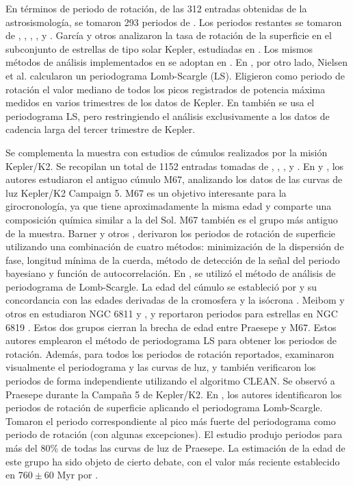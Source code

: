 En términos de periodo de rotación, de las 312 entradas obtenidas de la astrosismología, se tomaron 293 periodos de \cite{Garcia14}. Los periodos restantes se tomaron de \cite{Ceillier16}, \cite{Mazeh15}, \cite{McQuillan13a}, \cite{McQuillan14}, \cite{Nielsen13} y \cite{Reinhold13}. García y otros \cite{Garcia14} analizaron la tasa de rotación de la superficie en el subconjunto de estrellas de tipo solar Kepler, estudiadas en \cite{Garcia14}. Los mismos métodos de análisis implementados en \cite{Garcia14} se adoptan en \cite{Ceillier16}. En \cite{Nielsen13}, por otro lado, Nielsen et al. calcularon un periodograma Lomb-Scargle (LS). Eligieron como periodo de rotación el valor mediano de todos los picos registrados de potencia máxima medidos en varios trimestres de los datos de Kepler. En \cite{Reinhold13} también se usa el periodograma LS, pero restringiendo el análisis exclusivamente a los datos de cadencia larga del tercer trimestre de Kepler.

Se complementa la muestra con estudios de cúmulos realizados por la misión Kepler/K2. Se recopilan un total de 1152 entradas tomadas de \cite{Barnes16}, \cite{Gonzalez16}, \cite{Meibom11}, \cite{Meibom15} y \cite{Rebull17}. En \cite{Barnes16} y \cite{Gonzalez16}, los autores estudiaron el antiguo cúmulo M67, analizando los datos de las curvas de luz Kepler/K2 Campaign 5. M67 es un objetivo interesante para la girocronología, ya que tiene aproximadamente la misma edad y comparte una composición química similar a la del Sol. M67 también es el grupo más antiguo de la muestra. Barner y otros \cite{Barnes16}, derivaron los periodos de rotación de superficie utilizando una combinación de cuatro métodos: minimización de la dispersión de fase, longitud mínima de la cuerda, método de detección de la señal del periodo bayesiano y función de autocorrelación. En \cite{Gonzalez16}, se utilizó el método de análisis de periodograma de Lomb-Scargle. La edad del cúmulo se estableció por \cite{Barnes16} y su concordancia con las edades derivadas de la cromosfera \cite{Giampapa06} y la isócrona \cite{Bellini10}. Meibom y otros en \cite{Meibom11} estudiaron NGC 6811 \cite{Janes13} y \cite{Meibom15}, y reportaron periodos para estrellas en NGC 6819 \cite{Jeffries13}. Estos dos grupos cierran la brecha de edad entre Praesepe y M67. Estos autores emplearon el método de periodograma LS para obtener los periodos de rotación. Además, para todos los periodos de rotación reportados, examinaron visualmente el periodograma y las curvas de luz, y también verificaron los periodos de forma independiente utilizando el algoritmo CLEAN. Se observó a Praesepe durante la Campaña 5 de Kepler/K2. En \cite{Rebull17}, los autores identificaron los periodos de rotación de superficie aplicando el periodograma Lomb-Scargle. Tomaron el periodo correspondiente al pico más fuerte del periodograma como periodo de rotación (con algunas excepciones). El estudio produjo periodos para más del 80\% de todas las curvas de luz de Praesepe. La estimación de la edad de este grupo ha sido objeto de cierto debate, con el valor más reciente establecido en $760 \pm 60$ Myr por \cite{Brandt15}.


